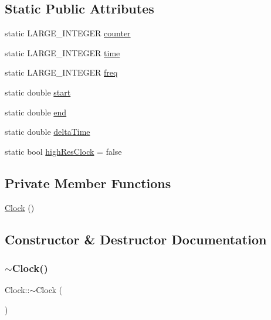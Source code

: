 \subsection*{Static Public Attributes}
\begin{DoxyCompactItemize}
\item 
static L\+A\+R\+G\+E\+\_\+\+I\+N\+T\+E\+G\+ER \hyperlink{class_ori_engine_1_1_clock_abe3180bfe2b7ae463f5ee6ce0e21e7c1}{counter}
\item 
static L\+A\+R\+G\+E\+\_\+\+I\+N\+T\+E\+G\+ER \hyperlink{class_ori_engine_1_1_clock_a38fb078b0bae590ca4ef633654082385}{time}
\item 
static L\+A\+R\+G\+E\+\_\+\+I\+N\+T\+E\+G\+ER \hyperlink{class_ori_engine_1_1_clock_af7e7d35c38fb0c2caec5e60b4b54d967}{freq}
\item 
static double \hyperlink{class_ori_engine_1_1_clock_a787b0d8adf09d20da696f502658cbcfb}{start}
\item 
static double \hyperlink{class_ori_engine_1_1_clock_afc43c686502126feebf54a99783dc7fd}{end}
\item 
static double \hyperlink{class_ori_engine_1_1_clock_afd164eb5b041271fe67e2c85ffb4c455}{delta\+Time}
\item 
static bool \hyperlink{class_ori_engine_1_1_clock_a30554fc8e22a92ae8b26ef881b802828}{high\+Res\+Clock} = false
\end{DoxyCompactItemize}
\subsection*{Private Member Functions}
\begin{DoxyCompactItemize}
\item 
\hyperlink{class_ori_engine_1_1_clock_adbc370eb6b5f8d01645cf440188160a8}{Clock} ()
\end{DoxyCompactItemize}


\subsection{Constructor \& Destructor Documentation}
\hypertarget{class_ori_engine_1_1_clock_afc976ce68fa85e15cc06f9ed47bddb7c}{}\label{class_ori_engine_1_1_clock_afc976ce68fa85e15cc06f9ed47bddb7c} 
\subsubsection{\texorpdfstring{$\sim$\+Clock()}{~Clock()}}
{\footnotesize\ttfamily Clock\+::$\sim$\+Clock (\begin{DoxyParamCaption}{ }\end{DoxyParamCaption})}

